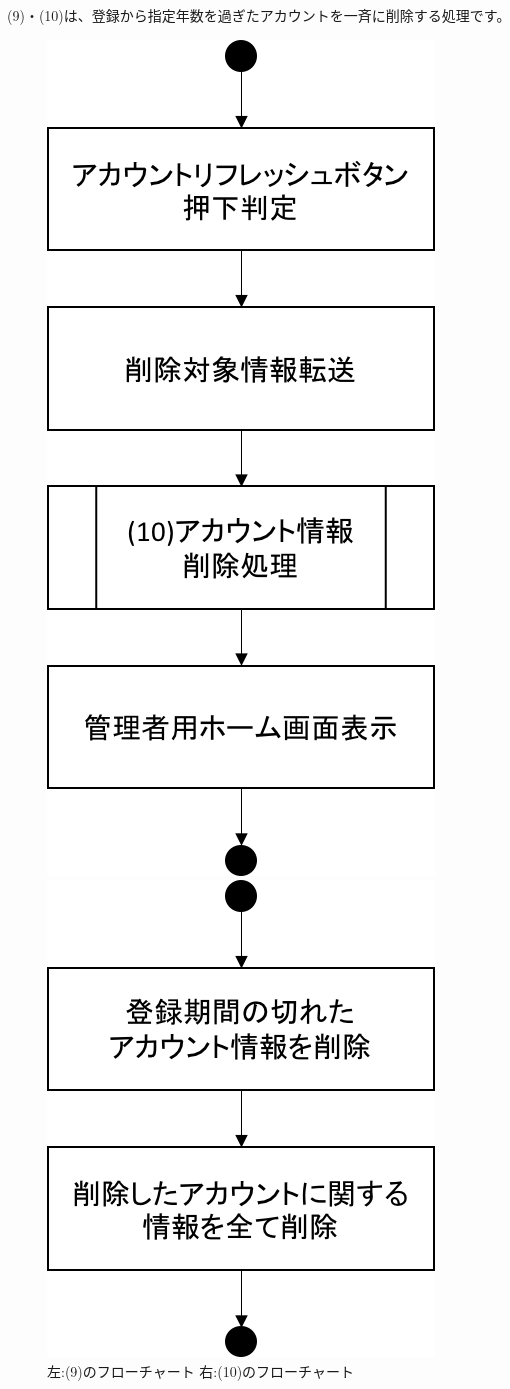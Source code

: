 (9)・(10)は、登録から指定年数を過ぎたアカウントを一斉に削除する処理です。

\begin{figure}[htbp]
 \begin{minipage}{0.5\hsize}
  \begin{center}
   \includegraphics[width=0.5\linewidth,clip]{./img/flow/9.png}
  \end{center}
 \end{minipage}
 \begin{minipage}{0.5\hsize}
  \begin{center}
   \includegraphics[width=0.5\linewidth,clip]{./img/flow/10.png}
  \end{center}
 \end{minipage}
 \caption{左:(9)のフローチャート 右:(10)のフローチャート}\label{fig:9to10}
\end{figure}




